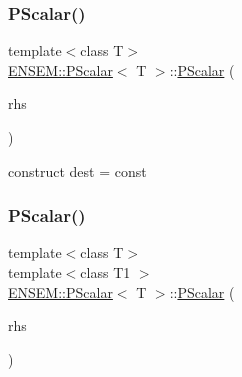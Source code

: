 \mbox{\label{classENSEM_1_1PScalar_aeb51f7fd0a7c5d9b7465ceabdb9311f8}} 
\subsubsection{\texorpdfstring{PScalar()}{PScalar()}\hspace{0.1cm}{\footnotesize\ttfamily [14/18]}}
{\footnotesize\ttfamily template$<$class T$>$ \\
\mbox{\hyperlink{classENSEM_1_1PScalar}{E\+N\+S\+E\+M\+::\+P\+Scalar}}$<$ T $>$\+::\mbox{\hyperlink{classENSEM_1_1PScalar}{P\+Scalar}} (\begin{DoxyParamCaption}\item[{const typename \mbox{\hyperlink{structENSEM_1_1WordType}{Word\+Type}}$<$ T $>$\+::Type\+\_\+t \&}]{rhs }\end{DoxyParamCaption})\hspace{0.3cm}{\ttfamily [inline]}}



construct dest = const 

\mbox{\label{classENSEM_1_1PScalar_a5dad766fb1a59a9e23d03b31f22916bb}} 
\subsubsection{\texorpdfstring{PScalar()}{PScalar()}\hspace{0.1cm}{\footnotesize\ttfamily [15/18]}}
{\footnotesize\ttfamily template$<$class T$>$ \\
template$<$class T1 $>$ \\
\mbox{\hyperlink{classENSEM_1_1PScalar}{E\+N\+S\+E\+M\+::\+P\+Scalar}}$<$ T $>$\+::\mbox{\hyperlink{classENSEM_1_1PScalar}{P\+Scalar}} (\begin{DoxyParamCaption}\item[{const \mbox{\hyperlink{classENSEM_1_1PScalar}{P\+Scalar}}$<$ T1 $>$ \&}]{rhs }\end{DoxyParamCaption})\hspace{0.3cm}{\ttfamily [inline]}}



